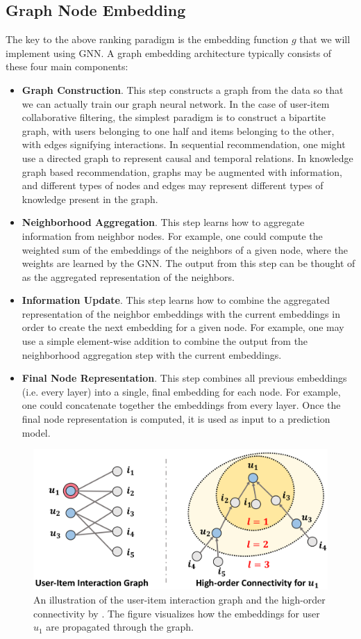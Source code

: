 \documentclass{article}
\begin{document}
\subsection{Graph Node Embedding} \label{gnn-paradigm}

The key to the above ranking paradigm is the embedding function $g$ that we will implement using GNN. A graph embedding architecture typically consists of these four main components:

\begin{itemize}
    \item \textbf{Graph Construction}. This step constructs a graph from the data so that we can actually train our graph neural network. In the case of user-item collaborative filtering, the simplest paradigm is to construct a bipartite graph, with users belonging to one half and items belonging to the other, with edges signifying interactions. In sequential recommendation, one might use a directed graph to represent causal and temporal relations. In knowledge graph based recommendation, graphs may be augmented with information, and different types of nodes and edges may represent different types of knowledge present in the graph.
    \item \textbf{Neighborhood Aggregation}. This step learns how to aggregate information from neighbor nodes. For example, one could compute the weighted sum of the embeddings of the neighbors of a given node, where the weights are learned by the GNN. The output from this step can be thought of as the aggregated representation of the neighbors.
    \item \textbf{Information Update}. This step learns how to combine the aggregated representation of the neighbor embeddings with the current embeddings in order to create the next embedding for a given node. For example, one may use a simple element-wise addition to combine the output from the neighborhood aggregation step with the current embeddings.
    \item \textbf{Final Node Representation}. This step combines all previous embeddings (i.e. every layer) into a single, final embedding for each node. For example, one could concatenate together the embeddings from every layer. Once the final node representation is computed, it is used as input to a prediction model.
\end{itemize}

\begin{figure}[H]
    \centering
    \includegraphics[width=.6\textwidth]{figs/ngcf-architecture.png}
    \caption{An illustration of the user-item interaction graph and the high-order connectivity by \cite{ngcf}. The figure visualizes how the embeddings for user $u_1$ are propagated through the graph.}
    \label{fig:user-item-interact-graph}
\end{figure}
\end{document}
